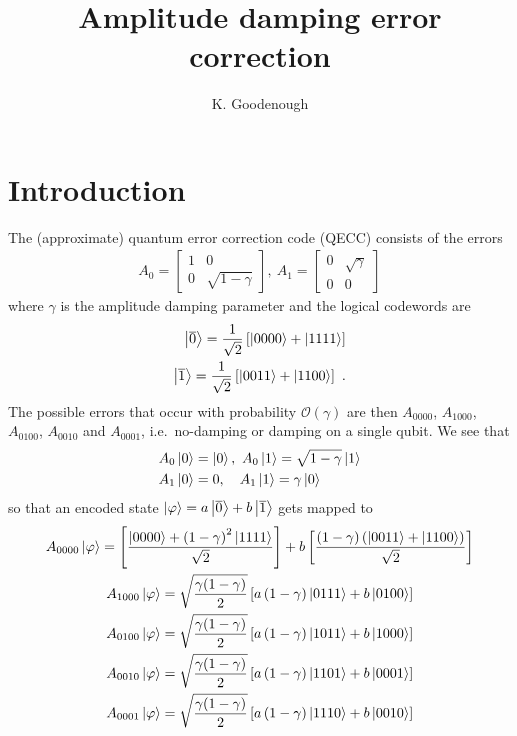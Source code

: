\documentclass[twoside]{article}
\begin{document}
\title{Amplitude damping error correction}
\author{K. Goodenough}

    \maketitle
\section*{Introduction}
\nonumber
The (approximate) quantum error correction code (QECC) consists of the errors
\begin{align}
A_0 = \begin{bmatrix}
1 & 0\\
0 & \sqrt{1-\gamma}
\end{bmatrix}
,~A_1 = \begin{bmatrix}
0 & \sqrt{\gamma}\\
0 & 0
\end{bmatrix}
\end{align}
where $\gamma$ is the amplitude damping parameter and the logical codewords are
\begin{align}
\Ket{\overline{0}} = \frac{1}{\sqrt{2}}\left[\Ket{0000}+\Ket{1111}\right]\\
\Ket{\overline{1}} = \frac{1}{\sqrt{2}}\left[\Ket{0011}+\Ket{1100}\right]\ .
\end{align}
The possible errors that occur with probability $\mathcal{O}(\gamma)$ are then $A_{0000}$, $A_{1000}$, $A_{0100}$, $A_{0010}$ and $A_{0001}$, i.e.~no-damping or damping on a single qubit. We see that
\begin{align}
&A_0\Ket{0} = \Ket{0},~A_0\Ket{1} = \sqrt{1-\gamma}\Ket{1}\\
&A_1\Ket{0} = 0,\ \ \ A_1\Ket{1} = \gamma\Ket{0}\\
\end{align}
so that an encoded state $\Ket{\varphi} = a\Ket{\overline{0}}+b\Ket{\overline{1}}$ gets mapped to
\begin{gather}
A_{0000}\Ket{\varphi}= \left[\frac{\Ket{0000}+\left(1-\gamma\right)^2\Ket{1111}}{\sqrt{2}}\right] + b\left[ \frac{\left(1-\gamma\right)\left(\Ket{0011}+\Ket{1100}\right)}{\sqrt{2}}\right]\\
A_{1000}\Ket{\varphi} = \sqrt{\frac{\gamma(1-\gamma)}{2}}\left[a\left(1-\gamma\right)\Ket{0111}+b\Ket{0100}\right]\\
A_{0100}\Ket{\varphi} = \sqrt{\frac{\gamma(1-\gamma)}{2}}\left[a\left(1-\gamma\right)\Ket{1011}+b\Ket{1000}\right]\\
A_{0010}\Ket{\varphi} = \sqrt{\frac{\gamma(1-\gamma)}{2}}\left[a\left(1-\gamma\right)\Ket{1101}+b\Ket{0001}\right]\\
A_{0001}\Ket{\varphi} = \sqrt{\frac{\gamma(1-\gamma)}{2}}\left[a\left(1-\gamma\right)\Ket{1110}+b\Ket{0010}\right]\\
\end{gather}
\end{document}

